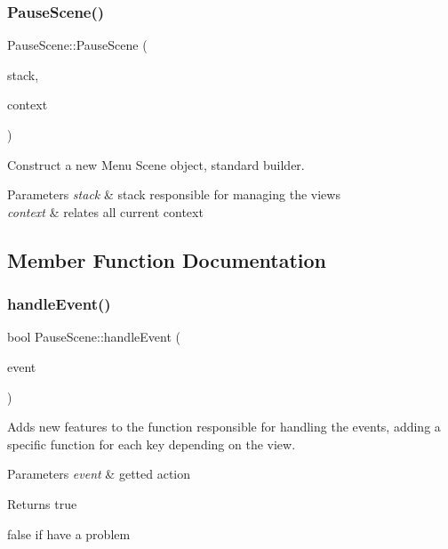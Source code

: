 \subsubsection{\texorpdfstring{Pause\+Scene()}{PauseScene()}}
{\footnotesize\ttfamily Pause\+Scene\+::\+Pause\+Scene (\begin{DoxyParamCaption}\item[{\hyperlink{classStateManager}{State\+Manager} \&}]{stack,  }\item[{\hyperlink{structState_1_1Context}{Context}}]{context }\end{DoxyParamCaption})}



Construct a new Menu Scene object, standard builder. 


\begin{DoxyParams}{Parameters}
{\em stack} & stack responsible for managing the views \\
\hline
{\em context} & relates all current context \\
\hline
\end{DoxyParams}


\subsection{Member Function Documentation}
\mbox{\label{classPauseScene_ad806125bd5ae985f24ff2cbfffc2c8e7}} 
\subsubsection{\texorpdfstring{handle\+Event()}{handleEvent()}}
{\footnotesize\ttfamily bool Pause\+Scene\+::handle\+Event (\begin{DoxyParamCaption}\item[{const sf\+::\+Event \&}]{event }\end{DoxyParamCaption})\hspace{0.3cm}{\ttfamily [virtual]}}



Adds new features to the function responsible for handling the events, adding a specific function for each key depending on the view. 


\begin{DoxyParams}{Parameters}
{\em event} & getted action \\
\hline
\end{DoxyParams}
\begin{DoxyReturn}{Returns}
true 

false if have a problem 
\end{DoxyReturn}


